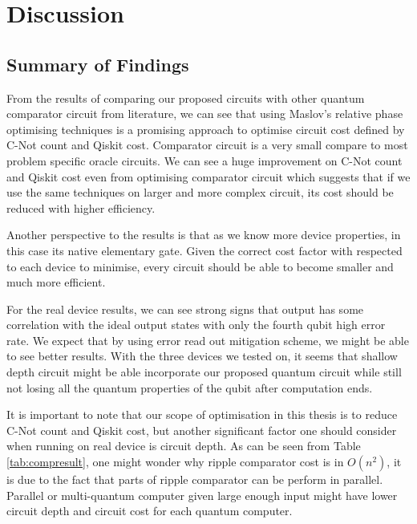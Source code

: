 \chapter{Discussion}

\section{Summary of Findings}
From the results of comparing our proposed circuits with other quantum comparator circuit from literature, we can see that using Maslov's relative phase optimising techniques is a promising approach to optimise circuit cost defined by C-Not count and Qiskit cost. Comparator circuit is a very small compare to most problem specific oracle circuits. We can see a huge improvement on C-Not count and Qiskit cost even from optimising comparator circuit which suggests that if we use the same techniques on larger and more complex circuit, its cost should be reduced with higher efficiency.

Another perspective to the results is that as we know more device properties, in this case its native elementary gate. Given the correct cost factor with respected to each device to minimise, every circuit should be able to become smaller and much more efficient.

For the real device results, we can see strong signs that output has some correlation with the ideal output states with only the fourth qubit high error rate. We expect that by using error read out mitigation scheme, we might be able to see better results. With the three devices we tested on, it seems that shallow depth circuit might be able incorporate our proposed quantum circuit while still not losing all the quantum properties of the qubit after computation ends. 

It is important to note that our scope of optimisation in this thesis is to reduce C-Not count and Qiskit cost, but another significant factor one should consider when running on real device is circuit depth. As can be seen from Table \ref{tab:compresult}, one might wonder why ripple comparator cost is in $O(n^2)$, it is due to the fact that parts of ripple comparator can be perform in parallel. Parallel or multi-quantum computer given large enough input might have lower circuit depth and circuit cost for each quantum computer. 


